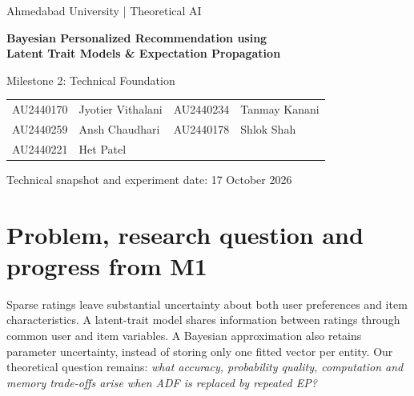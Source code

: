 \documentclass[11pt,a4paper]{article}
\begin{document}
\begin{center}
{\small Ahmedabad University \quad | \quad Theoretical AI}\par
\vspace{5pt}
{\Large\bfseries Bayesian Personalized Recommendation using\\[3pt]
Latent Trait Models \& Expectation Propagation}\par
\vspace{7pt}
{\large Milestone 2: Technical Foundation}\par
\vspace{6pt}
\begin{tabular}{ll@{\qquad}ll}
AU2440170 & Jyotier Vithalani & AU2440234 & Tanmay Kanani\\
AU2440259 & Ansh Chaudhari & AU2440178 & Shlok Shah\\
AU2440221 & Het Patel & &
\end{tabular}\par
\vspace{6pt}
{\small Technical snapshot and experiment date: 17 October 2026}
\end{center}
\vspace{2pt}
\begin{abstract}
This milestone turns the M1 proposal into a reproducible study of approximate
Bayesian inference. We implement an identity-only, static Matchbox variant with
Gaussian latent traits, user/item biases and fixed ordinal rating thresholds.
The implementation exposes the distinction between single-pass assumed-density
filtering (ADF) and repeated expectation propagation (EP): EP stores and removes
old rating messages before replacing them. Product factors use variational
messages, so the algorithm is a hybrid EP/VMP procedure. On the full MovieLens
1M dataset, three paired random splits give RMSE $0.8980\pm0.0049$ for ADF and
$0.8633\pm0.0040$ after five EP passes at eight traits. Mean fitting time rises
from 2.64 to 13.63 seconds, and EP requires 219.77 MiB of rating-site storage.
The conventional matrix-factorization baseline reaches clipped-point RMSE
$0.8646\pm0.0031$, making its accuracy close to EP5 at lower measured cost.
Nine mathematical and implementation checks pass. A separate quadrature study
reveals variance and correlation errors in the approximation. These are initial
technical results, not a reproduction of the complete Matchbox system or a
claim of state-of-the-art performance.
\end{abstract}

\section{Problem, research question and progress from M1}
Sparse ratings leave substantial uncertainty about both user preferences and
item characteristics. A latent-trait model shares information between ratings
through common user and item variables. A Bayesian approximation also retains
parameter uncertainty, instead of storing only one fitted vector per entity.
Our theoretical question remains: \emph{what accuracy, probability quality,
computation and memory trade-offs arise when ADF is replaced by repeated EP?}
\end{document}
